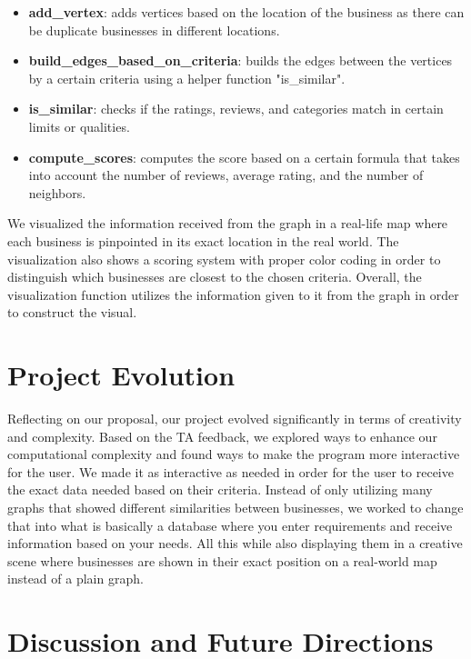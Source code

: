 \documentclass[fontsize=11pt]{article}
\begin{document}
\begin{itemize}
    \item \textbf{add\_vertex}: adds vertices based on the location of the business as there can be duplicate businesses in different locations.
    \item \textbf{build\_edges\_based\_on\_criteria}: builds the edges between the vertices by a certain criteria using a helper function "is\_similar".
    \item \textbf{is\_similar}: checks if the ratings, reviews, and categories match in certain limits or qualities.
    \item \textbf{compute\_scores}: computes the score based on a certain formula that takes into account the number of reviews, average rating, and the number of neighbors.
\end{itemize}

We visualized the information received from the graph in a real-life map where each business is pinpointed in its exact location in the real world. The visualization also shows a scoring system with proper color coding in order to distinguish which businesses are closest to the chosen criteria. Overall, the visualization function utilizes the information given to it from the graph in order to construct the visual.



\section*{Project Evolution}

Reflecting on our proposal, our project evolved significantly in terms of creativity and complexity. Based on the TA feedback, we explored ways to enhance our computational complexity and found ways to make the program more interactive for the user. We made it as interactive as needed in order for the user to receive the exact data needed based on their criteria. Instead of only utilizing many graphs that showed different similarities between businesses, we worked to change that into what is basically a database where you enter requirements and receive information based on your needs. All this while also displaying them in a creative scene where businesses are shown in their exact position on a real-world map instead of a plain graph.

\section*{Discussion and Future Directions}
\end{document}

